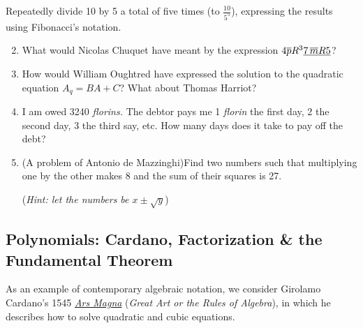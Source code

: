 \begin{exercises}{}{}
	\exstart Repeatedly divide 10 by 5 a total of five times (to $\frac{10}{5^5}$), expressing the results using Fibonacci's notation.
		
	\begin{enumerate}\setcounter{enumi}{1}
	  \item What would Nicolas Chuquet have meant by the expression $4\overline{p}R^3\underline{7\,\overline{m}R5}$?
	  
	  \item How would William Oughtred have expressed the solution to the quadratic equation $A_q=BA+C$? What about Thomas Harriot?
	  
	  \item%
		I am owed 3240 \emph{florins.} The debtor pays me 1 \emph{florin} the first day, 2 the second day, 3 the third say, etc. How many days does it take to pay off the debt?
	  
	  
		\item%
		(A problem of Antonio de Mazzinghi)\lstsp Find two numbers such that multiplying one by the other makes 8 and the sum of their squares is 27.\par
		(\emph{Hint: let the numbers be $x\pm\sqrt y$})
	\end{enumerate}
\end{exercises}

\clearpage



\subsection{Polynomials: Cardano, Factorization \& the Fundamental Theorem}

As an example of contemporary algebraic notation, we consider Girolamo Cardano's 1545 \href{http://math.uci.edu/~ndonalds/math184/cardano.pdf}{\emph{Ars Magna}} (\emph{Great Art or the Rules of Algebra}), in which he describes how to solve quadratic and cubic equations.\par

